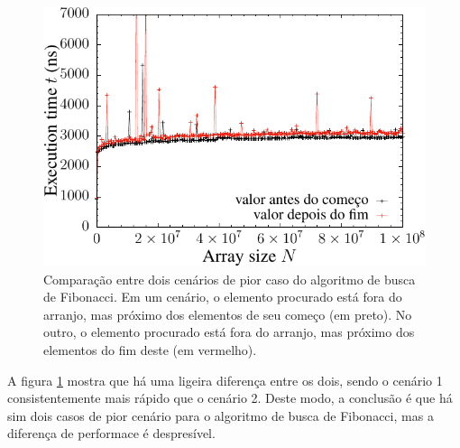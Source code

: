 \begin{figure}[H]
  \centering
  \includegraphics[scale=1.2]{../plots/fib2wc_search_time.pdf}
  \caption{Comparação entre dois cenários de pior caso do algoritmo de busca de Fibonacci. Em um cenário, o elemento procurado está fora do arranjo, mas próximo dos elementos de seu começo (em preto). No outro, o elemento procurado está fora do arranjo, mas próximo dos elementos do fim deste (em vermelho).}
  \label{fig:fib2wc_search_time}
\end{figure} 

A figura \ref{fig:fib2wc_search_time} mostra que há uma ligeira diferença entre os dois, sendo o cenário 1 consistentemente mais rápido que o cenário 2. Deste modo, a conclusão é que há sim dois casos de pior cenário para o algoritmo de busca de Fibonacci, mas a diferença de performace é despresível.
